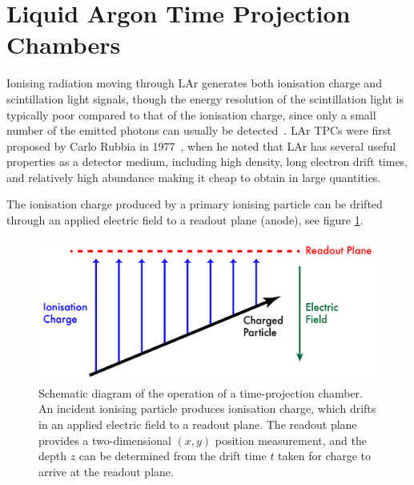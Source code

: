 \section{Liquid Argon Time Projection Chambers}
Ionising radiation moving through \ac{LAr} generates both ionisation charge and scintillation light signals, though the energy resolution of the scintillation light is typically poor compared to that of the ionisation charge, since only a small number of the emitted photons can usually be detected~\citep{Aprile2006}. \aclp{LAr TPC} were first proposed by Carlo Rubbia in 1977~\citep{Rubbia1977}, when he noted that \ac{LAr} has several useful properties as a detector medium, including high density, long electron drift times, and relatively high abundance making it cheap to obtain in large quantities.

The ionisation charge produced by a primary ionising particle can be drifted through an applied electric field to a readout plane (anode), see figure \ref{fig:tpc-schematic}.

\begin{figure}
\centering
\includegraphics[width=\textwidth]{chapters/detectorphysics_images/TPC-Schematic}
\caption[Schematic diagram of the operation of a time-projection chamber]{\label{fig:tpc-schematic}Schematic diagram of the operation of a time-projection chamber. An incident ionising particle produces ionisation charge, which drifts in an applied electric field to a readout plane. The readout plane provides a two-dimensional $(x,y)$ position measurement, and the depth $z$ can be determined from the drift time $t$ taken for charge to arrive at the readout plane.}
\end{figure}

